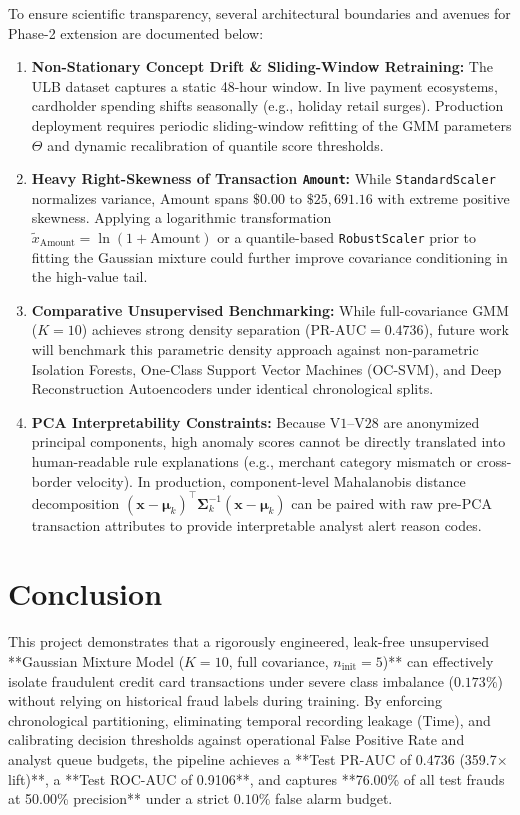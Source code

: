 \documentclass[11pt, a4paper]{article}
\begin{document}
To ensure scientific transparency, several architectural boundaries and avenues for Phase-2 extension are documented below:

\begin{enumerate}
    \item \textbf{Non-Stationary Concept Drift \& Sliding-Window Retraining:} The ULB dataset captures a static 48-hour window. In live payment ecosystems, cardholder spending shifts seasonally (e.g., holiday retail surges). Production deployment requires periodic sliding-window refitting of the GMM parameters $\Theta$ and dynamic recalibration of quantile score thresholds.
    \item \textbf{Heavy Right-Skewness of Transaction \texttt{Amount}:} While \texttt{StandardScaler} normalizes variance, $\text{Amount}$ spans $\$0.00$ to $\$25,691.16$ with extreme positive skewness. Applying a logarithmic transformation $\tilde{x}_{\text{Amount}} = \ln(1 + \text{Amount})$ or a quantile-based \texttt{RobustScaler} prior to fitting the Gaussian mixture could further improve covariance conditioning in the high-value tail.
    \item \textbf{Comparative Unsupervised Benchmarking:} While full-covariance GMM ($K=10$) achieves strong density separation ($\text{PR-AUC} = 0.4736$), future work will benchmark this parametric density approach against non-parametric Isolation Forests, One-Class Support Vector Machines (OC-SVM), and Deep Reconstruction Autoencoders under identical chronological splits.
    \item \textbf{PCA Interpretability Constraints:} Because $\text{V1}$--$\text{V28}$ are anonymized principal components, high anomaly scores cannot be directly translated into human-readable rule explanations (e.g., merchant category mismatch or cross-border velocity). In production, component-level Mahalanobis distance decomposition $(\mathbf{x} - \boldsymbol{\mu}_k)^{\top}\boldsymbol{\Sigma}_k^{-1}(\mathbf{x} - \boldsymbol{\mu}_k)$ can be paired with raw pre-PCA transaction attributes to provide interpretable analyst alert reason codes.
\end{enumerate}

\section{Conclusion}

This project demonstrates that a rigorously engineered, leak-free unsupervised **Gaussian Mixture Model ($K=10$, full covariance, $n_{\text{init}}=5$)** can effectively isolate fraudulent credit card transactions under severe class imbalance ($0.173\%$) without relying on historical fraud labels during training. By enforcing chronological partitioning, eliminating temporal recording leakage ($\text{Time}$), and calibrating decision thresholds against operational False Positive Rate and analyst queue budgets, the pipeline achieves a **Test PR-AUC of 0.4736 (359.7$\times$ lift)**, a **Test ROC-AUC of 0.9106**, and captures **76.00\% of all test frauds at 50.00\% precision** under a strict $0.10\%$ false alarm budget.
\end{document}

